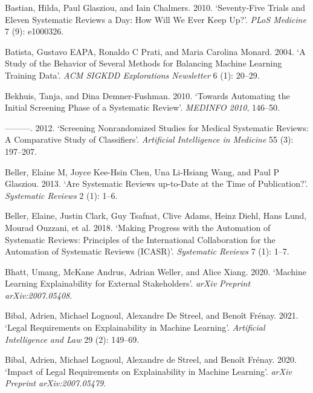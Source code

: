 \documentclass{article}
\newlength{\cslhangindent}
\newenvironment{CSLReferences}[2] %
 {%
  \setlength{\parindent}{0pt}
  \ifodd #1 \everypar{\setlength{\hangindent}{\cslhangindent}}\ignorespaces\fi
  \ifnum #2 > 0
  \setlength{\parskip}{#2\baselineskip}
  \fi
 }%
 {}
\begin{document}
\begin{CSLReferences}{1}{0}
\leavevmode{}%
Bastian, Hilda, Paul Glasziou, and Iain Chalmers. 2010. {`Seventy-Five
Trials and Eleven Systematic Reviews a Day: How Will We Ever Keep Up?'}.
\emph{PLoS Medicine} 7 (9): e1000326.

\leavevmode{}%
Batista, Gustavo EAPA, Ronaldo C Prati, and Maria Carolina Monard. 2004.
{`A Study of the Behavior of Several Methods for Balancing Machine
Learning Training Data'}. \emph{ACM SIGKDD Explorations Newsletter} 6
(1): 20--29.

\leavevmode{}%
Bekhuis, Tanja, and Dina Demner-Fushman. 2010. {`Towards Automating the
Initial Screening Phase of a Systematic Review'}. \emph{MEDINFO 2010},
146--50.

\leavevmode{}%
---------. 2012. {`Screening Nonrandomized Studies for Medical
Systematic Reviews: A Comparative Study of Classifiers'}.
\emph{Artificial Intelligence in Medicine} 55 (3): 197--207.

\leavevmode{}%
Beller, Elaine M, Joyce Kee-Hsin Chen, Una Li-Hsiang Wang, and Paul P
Glasziou. 2013. {`Are Systematic Reviews up-to-Date at the Time of
Publication?'}. \emph{Systematic Reviews} 2 (1): 1--6.

\leavevmode{}%
Beller, Elaine, Justin Clark, Guy Tsafnat, Clive Adams, Heinz Diehl,
Hans Lund, Mourad Ouzzani, et al. 2018. {`Making Progress with the
Automation of Systematic Reviews: Principles of the International
Collaboration for the Automation of Systematic Reviews (ICASR)'}.
\emph{Systematic Reviews} 7 (1): 1--7.

\leavevmode{}%
Bhatt, Umang, McKane Andrus, Adrian Weller, and Alice Xiang. 2020.
{`Machine Learning Explainability for External Stakeholders'}.
\emph{arXiv Preprint arXiv:2007.05408}.

\leavevmode{}%
Bibal, Adrien, Michael Lognoul, Alexandre De Streel, and Benoît Frénay.
2021. {`Legal Requirements on Explainability in Machine Learning'}.
\emph{Artificial Intelligence and Law} 29 (2): 149--69.

\leavevmode{}%
Bibal, Adrien, Michael Lognoul, Alexandre de Streel, and Benoît Frénay.
2020. {`Impact of Legal Requirements on Explainability in Machine
Learning'}. \emph{arXiv Preprint arXiv:2007.05479}.


\end{CSLReferences}
\end{document}
